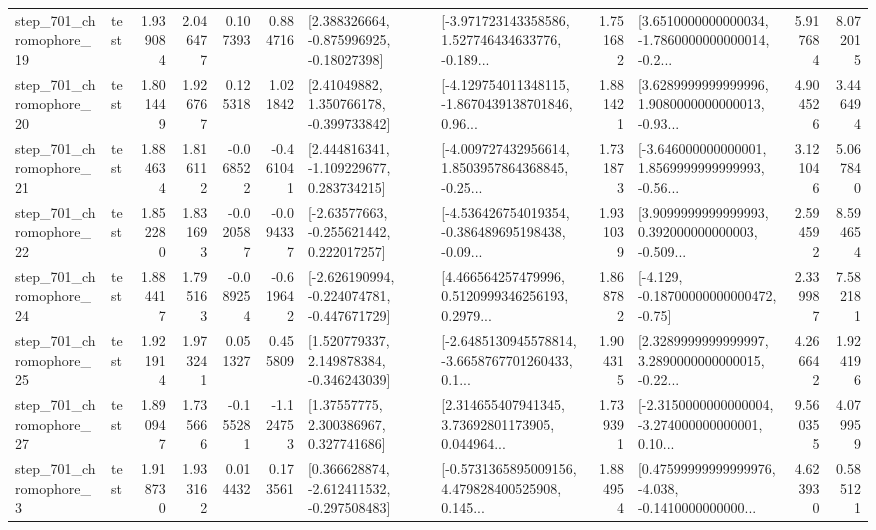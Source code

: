 \begin{tabular}{llrrrrllrlrr}
  step\_701\_chromophore\_19 &      test &      1.939084 &    2.046477 &      0.107393 &  0.884716 &    [2.388326664, -0.875996925, -0.18027398] &  [-3.971723143358586, 1.527746434633776, -0.189... &       1.751682 &  [3.6510000000000034, -1.7860000000000014, -0.2... &            5.917684 &          8.072015 \\
  step\_701\_chromophore\_20 &      test &      1.801449 &    1.926767 &      0.125318 &  1.021842 &     [2.41049882, 1.350766178, -0.399733842] &  [-4.129754011348115, -1.8670439138701846, 0.96... &       1.881421 &  [3.6289999999999996, 1.9080000000000013, -0.93... &            4.904526 &          3.446494 \\
  step\_701\_chromophore\_21 &      test &      1.884634 &    1.816112 &     -0.068522 & -0.461041 &    [2.444816341, -1.109229677, 0.283734215] &  [-4.009727432956614, 1.8503957864368845, -0.25... &       1.731873 &  [-3.646000000000001, 1.8569999999999993, -0.56... &            3.121046 &          5.067840 \\
  step\_701\_chromophore\_22 &      test &      1.852280 &    1.831693 &     -0.020587 & -0.094337 &    [-2.63577663, -0.255621442, 0.222017257] &  [-4.536426754019354, -0.386489695198438, -0.09... &       1.931039 &  [3.9099999999999993, 0.392000000000003, -0.509... &            2.594592 &          8.594654 \\
  step\_701\_chromophore\_24 &      test &      1.884417 &    1.795163 &     -0.089254 & -0.619642 &  [-2.626190994, -0.224074781, -0.447671729] &  [4.466564257479996, 0.5120999346256193, 0.2979... &       1.868782 &              [-4.129, -0.18700000000000472, -0.75] &            2.339987 &          7.582181 \\
  step\_701\_chromophore\_25 &      test &      1.921914 &    1.973241 &      0.051327 &  0.455809 &    [1.520779337, 2.149878384, -0.346243039] &  [-2.6485130945578814, -3.6658767701260433, 0.1... &       1.904315 &  [2.3289999999999997, 3.2890000000000015, -0.22... &            4.266642 &          1.924196 \\
  step\_701\_chromophore\_27 &      test &      1.890947 &    1.735666 &     -0.155281 & -1.124753 &      [1.37557775, 2.300386967, 0.327741686] &  [2.314655407941345, 3.73692801173905, 0.044964... &       1.739391 &  [-2.3150000000000004, -3.274000000000001, 0.10... &            9.560355 &          4.079959 \\
   step\_701\_chromophore\_3 &      test &      1.918730 &    1.933162 &      0.014432 &  0.173561 &   [0.366628874, -2.612411532, -0.297508483] &  [-0.5731365895009156, 4.479828400525908, 0.145... &       1.884954 &  [0.47599999999999976, -4.038, -0.1410000000000... &            4.623930 &          0.585121 \\

\end{tabular}
